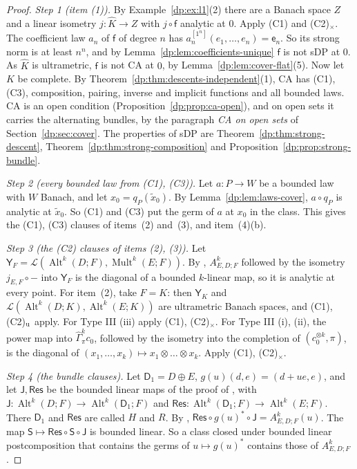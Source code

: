 \documentclass[11pt]{amsart}
\theoremstyle{definition}
\theoremstyle{remark}
\numberwithin{equation}{section}
\newcommand{\cL}{\mathcal L}
\newcommand{\Alt}{\operatorname{Alt}}
\newcommand{\Mult}{\operatorname{Mult}}
\newcommand{\Kh}{\widehat K}
\theoremstyle{plain}
\theoremstyle{definition}
\theoremstyle{plain}
\newcommand{\hGamma}{\widehat\Gamma}
\begin{document}
\begin{proof}
\emph{Step 1 (item (1)).} By Example~\ref{dp:ex:l1}(2) there are a Banach space $Z$ and a linear isometry $j\colon\Kh\to Z$ with $j\circ\mathsf f$ analytic at $0$. Apply (C1) and (C2)$_\times$. The coefficient law $a_n$ of $\mathsf f$ of degree $n$ has $a_n^{[1^n]}(e_1,\dots,e_n)=\mathsf e_n$. So its strong norm is at least $n^n$, and by Lemma~\ref{dp:lem:coefficients-unique} $\mathsf f$ is not sDP at $0$. As $\Kh$ is ultrametric, $\mathsf f$ is not CA at $0$, by Lemma~\ref{dp:lem:cover-flat}(5). Now let $K$ be complete. By Theorem~\ref{dp:thm:descents-independent}(1), CA has (C1), (C3), composition, pairing, inverse and implicit functions and all bounded laws. CA is an open condition (Proposition~\ref{dp:prop:ca-open}), and on open sets it carries the alternating bundles, by the paragraph \emph{CA on open sets} of Section~\ref{dp:sec:cover}. The properties of sDP are Theorem~\ref{dp:thm:strong-descent}, Theorem~\ref{dp:thm:strong-composition} and Proposition~\ref{dp:prop:strong-bundle}.

\emph{Step 2 (every bounded law from \textup{(C1)}, \textup{(C3)}).} Let $a\colon P\to W$ be a bounded law with $W$ Banach, and let $x_0=q_P(\tilde x_0)$. By Lemma~\ref{dp:lem:laws-cover}, $a\circ q_P$ is analytic at $\tilde x_0$. So (C1) and (C3) put the germ of $a$ at $x_0$ in the class. This gives the (C1), (C3) clauses of items~(2) and~(3), and item~(4)(b).

\emph{Step 3 (the (C2) clauses of items (2), (3)).} Let $\mathsf Y_F=\cL(\Alt^k(D;F),\Mult^k(E;F))$. By \cite[Proposition~2.2]{I}, $A^k_{E,D;F}$ followed by the isometry $j_{E,F}\circ{-}$ into $\mathsf Y_F$ is the diagonal of a bounded $k$\nobreakdash-linear map, so it is analytic at every point. For item~(2), take $F=K$: then $\mathsf Y_K$ and $\cL(\Alt^k(D;K),\Alt^k(E;K))$ are ultrametric Banach spaces, and (C1), (C2)$_{\rm u}$ apply. For Type III (iii) apply (C1), (C2)$_\times$. For Type III (i), (ii), the power map into $\hGamma^k_\pi c_0$, followed by the isometry into the completion of $(c_0^{\otimes k},\pi)$, is the diagonal of $(x_1,\dots,x_k)\mapsto x_1\otimes\dots\otimes x_k$. Apply (C1), (C2)$_\times$.

\emph{Step 4 (the bundle clauses).} Let $\mathsf D_1=D\oplus E$, $g(u)(d,e)=(d+ue,e)$, and let $\mathsf J,\mathsf{Res}$ be the bounded linear maps of the proof of \cite[Proposition~10.1]{I}, with $\mathsf J\colon\Alt^k(D;F)\to\Alt^k(\mathsf D_1;F)$ and $\mathsf{Res}\colon\Alt^k(\mathsf D_1;F)\to\Alt^k(E;F)$. There $\mathsf D_1$ and $\mathsf{Res}$ are called $H$ and $R$. By \cite[(10.1)]{I}, $\mathsf{Res}\circ g(u)^*\circ\mathsf J=A^k_{E,D;F}(u)$. The map $\mathsf S\mapsto\mathsf{Res}\circ\mathsf S\circ\mathsf J$ is bounded linear. So a class closed under bounded linear postcomposition that contains the germs of $u\mapsto g(u)^*$ contains those of $A^k_{E,D;F}$.


\end{proof}
\end{document}
